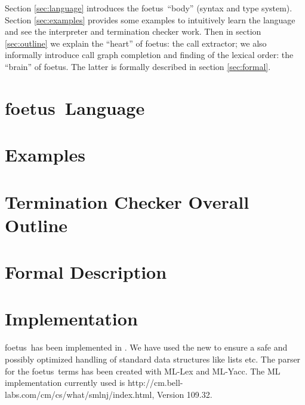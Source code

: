 \documentclass[12pt,a4paper]{article}
\newcommand{\foetus}{{\sf foetus}}
\begin{document}
Section \ref{sec:language} introduces the \foetus\ ``body'' (syntax and type
system). Section \ref{sec:examples} provides some examples to
intuitively learn the language and see the interpreter and termination
checker work. Then in section \ref{sec:outline} we explain the
``heart'' of \foetus: the call extractor; we also informally introduce
call graph completion and finding of the lexical order: the ``brain'' of
\foetus. The latter is formally described in section \ref{sec:formal}.


\section{\foetus\ Language\label{sec:language}}


\section{Examples\label{sec:examples}}


\section{Termination Checker Overall Outline\label{sec:outline}}


\section{Formal Description\label{sec:formal}}


\section{Implementation\label{sec:implementation}}
\foetus\ has been implemented in
. We have used the
new 
to ensure a safe and possibly optimized handling of standard data
structures like lists etc. The parser for the \foetus\ terms has been
created with ML-Lex and ML-Yacc.
The ML implementation currently used is
%
{http://cm.bell-labs.com/cm/cs/what/smlnj/index.html}, Version 109.32.
\end{document}
